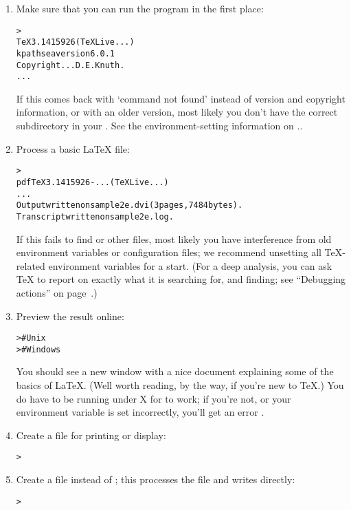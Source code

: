 \documentclass{article}
\begin{document}
\begin{enumerate}

\item Make sure that you can run the  program in the first
place:
\begin{alltt}
> 
TeX 3.1415926 (TeX Live ...)
kpathsea version 6.0.1
Copyright ... D.E. Knuth.
...
\end{alltt}
If this comes back with `command not found' instead of version and
copyright information, or with an older version, most likely you don't
have the correct  subdirectory in your .  See
the environment-setting information on \p.\pageref{sec:env}.

\item Process a basic \LaTeX{} file:
\begin{alltt}
> 
pdfTeX 3.1415926-... (TeX Live ...)
...
Output written on sample2e.dvi (3 pages, 7484 bytes).
Transcript written on sample2e.log.
\end{alltt}
If this fails to find  or other files, most
likely you have interference from old environment variables or
configuration files; we recommend unsetting all \TeX-related environment
variables for a start.  (For a deep analysis, you can ask \TeX{} to
report on exactly what it is searching for, and finding; see ``Debugging
actions'' on page~\pageref{sec:debugging}.)

\item Preview the result online:
\begin{alltt}
>     # Unix
>   # Windows
\end{alltt}
You should see a new window with a nice document explaining some of the
basics of \LaTeX{}.  (Well worth reading, by the way, if you're new to
\TeX.)  You do have to be running under X for  to work; if
you're not, or your  environment variable is set
incorrectly, you'll get an error .

\item Create a \PS{} file for printing or display:
\begin{alltt}
> 
\end{alltt}

\item Create a  file instead of \dvi{}; this processes the
 file and writes  directly:
\begin{alltt}
> 
\end{alltt}


\end{enumerate}
\end{document}
